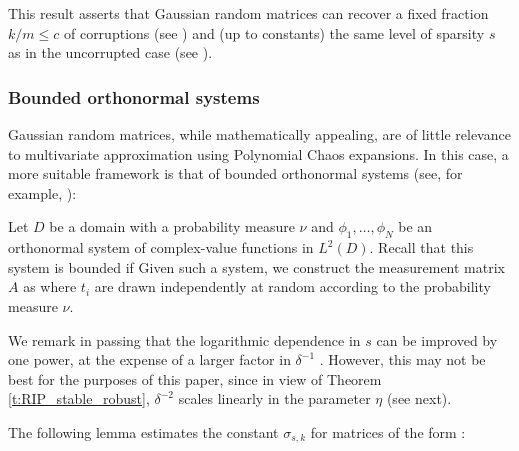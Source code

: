 \documentclass[10.5pt]{article}
\begin{document}
This result asserts that Gaussian random matrices can recover a fixed fraction $k/m \leq c$ of corruptions (see ) and (up to constants) the same level of sparsity $s$ as in the uncorrupted case (see ).




\subsubsection{Bounded orthonormal systems}\label{sec:bos}

Gaussian random matrices, while mathematically appealing, are of little relevance to multivariate approximation using Polynomial Chaos expansions.  In this case, a more suitable framework is that of bounded orthonormal systems (see, for example, \cite[Chpt.\ 12]{FoucartRauhutCSbook}):

Let $D$ be a domain with a probability measure $\nu$ and $\phi_1,\ldots,\phi_N$ be an orthonormal system of complex-value functions in $L^2(D)$.  Recall that this system is bounded if
Given such a system, we construct the measurement matrix $A$ as
where $t_i$ are drawn independently at random according to the probability measure $\nu$.  


We remark in passing that the logarithmic dependence in $s$ can be improved by one power, at the expense of a larger factor in $\delta^{-1}$ \cite{ChkifaDownwardsCS}.  However, this may not be best for the purposes of this paper, since in view of Theorem \ref{t:RIP_stable_robust}, $\delta^{-2}$ scales linearly in the parameter $\eta$ (see next).   

The following lemma estimates the constant $\sigma_{s,k}$ for matrices of the form :
\end{document}
